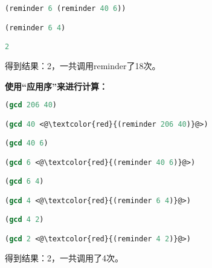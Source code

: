 \documentclass[11pt, a4paper]{article}
\begin{document}
\begin{CJK}{UTF8}{gkai}
\begin{lstlisting}[language=Lisp,caption=Four times]
(reminder 6 (reminder 40 6))

(reminder 6 4)

2 
\end{lstlisting}
得到结果：2，一共调用reminder了18次。\newline

\noindent\textbf{使用“应用序”来进行计算：}
\begin{lstlisting}[language=Lisp]
(gcd 206 40)

(gcd 40 <@\textcolor{red}{(reminder 206 40)}@>)

(gcd 40 6)

(gcd 6 <@\textcolor{red}{(reminder 40 6)}@>)

(gcd 6 4)

(gcd 4 <@\textcolor{red}{(reminder 6 4)}@>)

(gcd 4 2)

(gcd 2 <@\textcolor{red}{(reminder 4 2)}@>)
\end{lstlisting}
得到结果：2，一共调用了4次。
\end{CJK}
\end{document}
